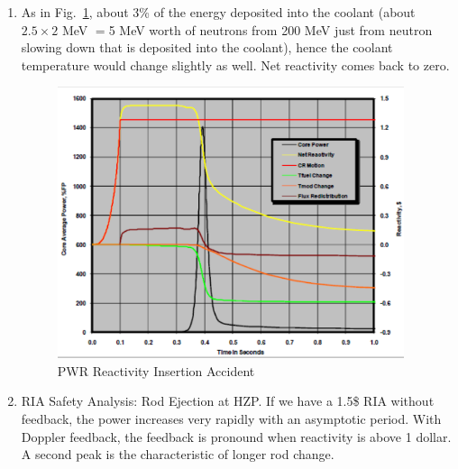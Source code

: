 \documentclass{school-22.211-notes}
\begin{document}
\begin{enumerate}
\item As in Fig.~\ref{fn4}, about 3\% of the energy deposited into the coolant (about $2.5 \times 2$ MeV $=$5 MeV worth of neutrons from 200 MeV just from neutron slowing down that is deposited into the coolant), hence the coolant temperature would change slightly as well. Net reactivity comes back to zero.
  \begin{figure}[ht] 
    \centering
    \includegraphics[width=4in]{images/pke/fn4.png}
    \caption{PWR Reactivity Insertion Accident} \label{fn4}
  \end{figure}

\item RIA Safety Analysis: Rod Ejection at HZP. If we have a 1.5\$ RIA without feedback, the power increases very rapidly with an asymptotic period. With Doppler feedback, the feedback is pronound when reactivity is above 1 dollar. A second peak is the characteristic of longer rod change. 
\end{enumerate}
\end{document}
